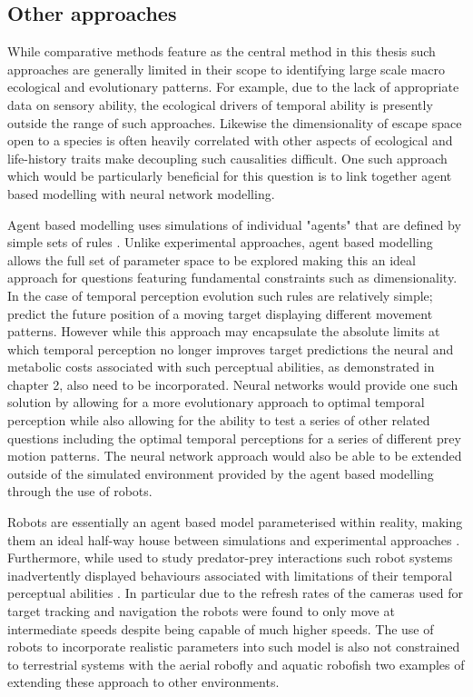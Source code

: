\subsection{Other approaches}

While comparative methods feature as the central method in this thesis such approaches are generally limited in their scope to identifying large scale macro ecological and evolutionary patterns. For example, due to the lack of appropriate data on sensory ability, the ecological drivers of temporal ability is presently outside the range of such approaches. Likewise the dimensionality of escape space open to a species is often heavily correlated with other aspects of ecological and life-history traits make decoupling such causalities difficult. One such approach which would be particularly beneficial for this question is to link together agent based modelling with neural network modelling. 


Agent based modelling uses simulations of individual "agents" that are defined by simple sets of rules \citep{tisue2004netlogo}. Unlike experimental approaches, agent based modelling allows the full set of parameter space to be explored making this an ideal approach for questions featuring fundamental constraints such as dimensionality. In the case of temporal perception evolution such rules are relatively simple; predict the future position of a moving target displaying different movement patterns. However while this approach may encapsulate the absolute limits at which temporal perception no longer improves target predictions the neural and metabolic costs associated with such perceptual abilities, as demonstrated in chapter 2, also need to be incorporated. Neural networks would provide one such solution by allowing for a more evolutionary approach to optimal temporal perception while also allowing for the ability to test a series of other related questions including the optimal temporal perceptions for a series of different prey motion patterns. The neural network approach would also be able to be extended outside of the simulated environment provided by the agent based modelling through the use of robots. 


Robots are essentially an agent based model parameterised within reality, making them an ideal half-way house between simulations and experimental approaches \citep{floreano2010evolution}. Furthermore, while used to study predator-prey interactions such robot systems inadvertently displayed behaviours associated with limitations of their temporal perceptual abilities \citep{floreano2010evolution}. In particular due to the refresh rates of the cameras used for target tracking and navigation the robots were found to only move at intermediate speeds despite being capable of much higher speeds. The use of robots to incorporate realistic parameters into such model is also not constrained to terrestrial systems with the aerial robofly \citep{lauder2001aerodynamics} and aquatic robofish \citep{faria2010novel} two examples of extending these approach to other environments.


